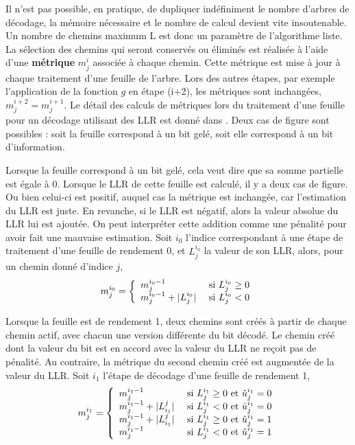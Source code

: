 Il n'est pas possible, en pratique, de dupliquer indéfiniment le nombre d'arbres de décodage, la mémoire nécessaire et le nombre de calcul devient vite insoutenable. Un nombre de chemins maximum $\mathrm{L}$ est donc un paramètre de l'algorithme liste. La sélection des chemins qui seront conservés ou éliminés est réalisée à l'aide d'une \textbf{métrique} $m^i_j$ associée à chaque chemin. Cette métrique est mise à jour à chaque traitement d'une feuille de l'arbre. Lors des autres étapes, par exemple l'application de la fonction $g$ en étape (i+2), les métriques sont inchangées, $m^{i+2}_j = m^{i+1}_j$. Le détail des calculs de métriques lors du traitement d'une feuille pour un décodage utilisant des LLR est donné dans \cite{balatsoukas-stimming_llr-based_2015}. Deux cas de figure sont possibles : soit la feuille correspond à un bit gelé, soit elle correspond à un bit d'information.

Lorsque la feuille correspond à un bit gelé, cela veut dire que sa somme partielle est égale à 0. Lorsque le LLR de cette feuille est calculé, il y a deux cas de figure. Ou bien celui-ci est positif, auquel cas la métrique est inchangée, car l'estimation du LLR est juste. 
En revanche, si le LLR est négatif, alors la valeur absolue du LLR lui est ajoutée. On peut interpréter cette addition comme une \og pénalité \fg pour avoir fait une mauvaise estimation. Soit $i_0$ l'indice correspondant à une étape de traitement d'une feuille de rendement 0, et $L_j^{i_0}$ la valeur de son LLR, alors, pour un chemin donné d'indice $j$, 
\begin{equation*}
m^{i_0}_j=\left\{\begin{array}{l c l} m_j^{{i_0}-1} & \text{ si } L_j^{i_0} \geq 0 \\ m_j^{{i_0}-1} + |L_j^{i_0}| & \text{ si } L_j^{i_0} < 0 \end{array}\right.
\end{equation*}

Lorsque la feuille est de rendement 1, deux chemins sont créés à partir de chaque chemin actif, avec chacun une version différente du bit décodé. Le chemin créé dont la valeur du bit est en accord avec la valeur du LLR ne reçoit pas de pénalité. Au contraire, la métrique du second chemin créé est augmentée de la valeur du LLR. Soit $i_1$ l'étape de décodage d'une feuille de rendement 1,
\begin{equation*}
m^{i_1}_j=\left\{\begin{array}{l c l} m_j^{{i_1}-1}               & \text{ si } L^{i_1}_j \geq 0 \text{ et } \hat{u}^{i_1}_j = 0
                                   \\ m_j^{{i_1}-1} + |L^j_{i_1}| & \text{ si } L^{i_1}_j < 0    \text{ et } \hat{u}^{i_1}_j = 0
                                   \\ m_j^{{i_1}-1} + |L^j_{i_1}| & \text{ si } L^{i_1}_j \geq 0 \text{ et } \hat{u}^{i_1}_j = 1
                                   \\ m_j^{{i_1}-1}               & \text{ si } L^{i_1}_j < 0    \text{ et } \hat{u}^{i_1}_j = 1

                \end{array}\right.
\end{equation*}

